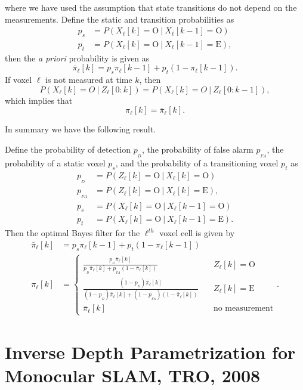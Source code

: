 where we have used the assumption that state transitions do not depend on the measurements.  Define the static and transition probabilities as
\begin{align*}
p_{s} &= P(X_\ell[k] = \text{O}~|~ X_\ell[k-1]=\text{O}) \\
p_ {t}&= P(X_\ell[k] = \text{O}~|~ X_\ell[k-1]=\text{E}),
\end{align*}
then the {\em a priori} probability is given as
\[
\bar{\pi}_\ell[k] = p_{s}\pi_\ell[k-1] + p_{t}(1-\pi_\ell[k-1]).
\]
If voxel $\ell$ is not measured at time $k$, then 
\[
P(X_\ell[k]=O ~|~ Z_\ell[0:k]) = P(X_\ell[k]=O ~|~ Z_\ell[0:k-1]),
\]
which implies that
\[
\pi_\ell[k] = \bar{\pi}_\ell[k].
\]

In summary we have the following result.
\begin{lemma}
	Define the probability of detection $p_{_D}$, the probability of false alarm $p_{_{FA}}$, the probability of a static voxel $p_{s}$, and the probability of a transitioning voxel $p_{t}$ as
	\begin{align*}
		p_{_D} &= P(Z_\ell[k]=\text{O} ~|~ X_\ell[k]=\text{O}) \\
		p_{_{FA}} &= P(Z_\ell[k]=\text{O} ~|~ X_\ell[k]=\text{E}), \\
		p_s &= P(X_\ell[k] = \text{O}~|~ X_\ell[k-1]=\text{O}) \\
		p_t &= P(X_\ell[k] = \text{O}~|~ X_\ell[k-1]=\text{E}).
	\end{align*}
	Then the optimal Bayes filter for the $\ell^{th}$ voxel cell is given by
	\begin{align*}
		\bar{\pi}_\ell[k] &= p_{s}\pi_\ell[k-1] + p_{t}(1-\pi_\ell[k-1]) \\
		\pi_\ell[k] &= \begin{cases}
		\frac{p_{_D} \bar{\pi}_\ell[k]}{p_{_D}\bar{\pi}_\ell[k]+p_{_{FA}}(1-\bar{\pi}_\ell[k])} &\quad Z_\ell[k]=\text{O} \\
		\frac{(1-p_{_D}) \bar{\pi}_\ell[k]}{(1-p_{_D})\bar{\pi}_\ell[k]+(1-p_{_{FA}})(1-\bar{\pi}_\ell[k])} &\quad Z_\ell[k]=\text{E}  \\
		\bar{\pi}_\ell[k] &\quad \text{no measurement}
		\end{cases}.
	\end{align*}
	
	
\end{lemma}



\clearpage
\section{Inverse Depth Parametrization for Monocular SLAM, TRO, 2008}





